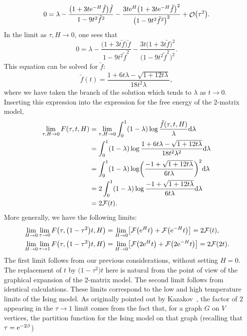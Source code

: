 \documentclass[10pt,a4paper]{amsart}
\DeclareMathOperator{\OO}{\mathcal{O}}
\numberwithin{equation}{section}
\begin{document}
\begin{Remark}
 \begin{equation*}
 0 = \lambda - \frac{\bigl(1+3t{\rm e}^{-H}\tilde{f}\bigr)\tilde{f}}{1-9t^2\tilde{f}^2} - \frac{3t{\rm e}^H\bigl(1+3t{\rm e}^{-H}\tilde{f}\bigr)^2}{\bigl(1-9t^2\tilde{f}^2\bigr)^2} + \OO\bigl(\tau^2\bigr).
 \end{equation*}
 In the limit as $\tau,H\to 0$, one sees that
 \begin{equation*}
 0 = \lambda - \frac{\bigl(1+3t\tilde{f}\bigr)\tilde{f}}{1-9t^2\tilde{f}^2} - \frac{3t\bigl(1+3t\tilde{f}\bigr)^2}{\bigl(1-9t^2\tilde{f}^2\bigr)^2}.
 \end{equation*}
 This equation can be solved for $\tilde{f}$:
 \begin{equation*}
 \tilde{f}(t) = \frac{1 + 6t\lambda -\sqrt{1 + 12t\lambda}}{18t^2\lambda},
 \end{equation*}
 where we have taken the branch of the solution which tends to $\lambda$ as $t\to 0$.
 Inserting this expression into the expression for the free energy of the $2$-matrix model,
 \begin{align*}
 \lim_{\tau,H\to 0} F(\tau,t,H) &= \lim_{\tau,H\to 0} \int_{0}^{1}(1-\lambda) \log\frac{\tilde{f}(\tau,t,H)}{\lambda} {\rm d}\lambda\\
 &= \int_{0}^{1}(1-\lambda) \log\frac{1 + 6t\lambda -\sqrt{1 + 12t\lambda}}{18t^2\lambda^2} {\rm d}\lambda\\
 &= \int_{0}^{1}(1-\lambda) \log\biggl(\frac{-1 + \sqrt{1+12t\lambda}}{6t\lambda}\biggr)^2 {\rm d}\lambda\\
 &=2\int_{0}^{1}(1-\lambda) \log\frac{-1 + \sqrt{1+12t\lambda}}{6t\lambda} {\rm d}\lambda\\
 &=2\mathcal{F}(t).
 \end{align*}
 More generally, we have the following limits:
 \begin{align*}
 &\lim_{H\to 0}\lim_{\tau\to 0} F\bigl(\tau,\bigl(1-\tau^2\bigr)t,H\bigr)= \lim_{H\to 0}\bigl[\mathcal{F}\bigl({\rm e}^{H}t\bigr) + \mathcal{F}\bigl({\rm e}^{-H}t\bigr)\bigr] = 2\mathcal{F}(t),\\
 &\lim_{H\to 0}\lim_{\tau\to 1} F\bigl(\tau,\bigl(1-\tau^2\bigr)t,H\bigr)= \lim_{H\to 0}\bigl[\mathcal{F}\bigl(2{\rm e}^{H}t\bigr) + \mathcal{F}\bigl(2{\rm e}^{-H}t\bigr)\bigr] = 2\mathcal{F}(2t).
 \end{align*}
 The first limit follows from our previous considerations, without setting $H=0$. The replacement of $t$ by $\bigl(1-\tau^2\bigr)t$ here is natural from the point
 of view of the graphical expansion of the $2$-matrix model. The second limit follows from identical calculations. These limits correspond to the low and high temperature limits of the Ising model. As originally pointed out by Kazakov~\cite{Kazakov1}, the factor of $2$ appearing in the $\tau\to 1$ limit comes from the fact that, for a graph $G$ on $V$ vertices, the partition function for the Ising model on that graph \big(recalling that $\tau = {\rm e}^{-2\beta}$\big)

\end{Remark}
\end{document}
